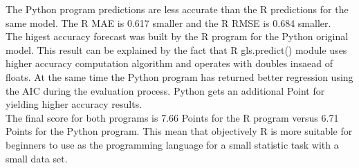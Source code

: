 \documentclass[
  twoside,
  12pt, a4paper,
  footinclude=true,
  headinclude=true,
  cleardoublepage=empty
]{article}
\begin{document}
The Python program predictions are less accurate than the R predictions for the same model. The R MAE is 0.617 smaller and the R RMSE is 0.684 smaller.\\
The higest accuracy forecast was built by the R program for the Python original model. This result can be explained by the fact that R gls.predict() module uses higher accuracy computation algorithm and operates with doubles insaead of floats. At the same time the Python program has returned better regression using the AIC during the evaluation process. Python gets an additional Point for yielding higher accuracy results.\\
The final score for both programs is 7.66 Points for the R program versus 6.71 Points for the Python program. This mean that objectively R is more suitable for beginners to use as the programming language for a small statistic task with a small data set.
\end{document}
